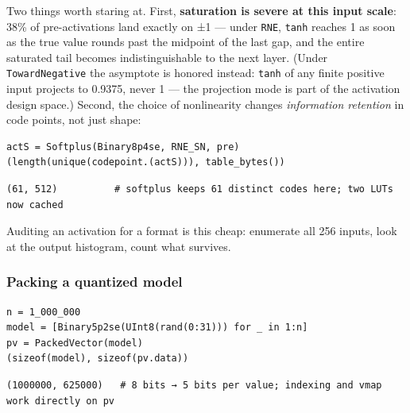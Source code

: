 Two things worth staring at. First, \textbf{saturation is severe at this input scale}: 38\% of pre-activations land exactly on ±1 — under \texttt{RNE}, \texttt{tanh} reaches 1 as soon as the true value rounds past the midpoint of the last gap, and the entire saturated tail becomes indistinguishable to the next layer. (Under \texttt{TowardNegative} the asymptote is honored instead: \texttt{tanh} of any finite positive input projects to 0.9375, never 1 — the projection mode is part of the activation design space.) Second, the choice of nonlinearity changes \emph{information retention} in code points, not just shape:




\nopagebreak[4]
\begin{minipage}{\linewidth}
\begin{verbatim}
actS = Softplus(Binary8p4se, RNE_SN, pre)
(length(unique(codepoint.(actS))), table_bytes())
\end{verbatim}




\begin{verbatim}
(61, 512)          # softplus keeps 61 distinct codes here; two LUTs now cached
\end{verbatim}
\end{minipage}




Auditing an activation for a format is this cheap: enumerate all 256 inputs, look at the output histogram, count what survives.



\subsubsection{Packing a quantized model}



\label{856710218023185633}{}



\begin{minipage}{\linewidth}
\begin{verbatim}
n = 1_000_000
model = [Binary5p2se(UInt8(rand(0:31))) for _ in 1:n]
pv = PackedVector(model)
(sizeof(model), sizeof(pv.data))
\end{verbatim}




\begin{verbatim}
(1000000, 625000)   # 8 bits → 5 bits per value; indexing and vmap work directly on pv
\end{verbatim}
\end{minipage}




